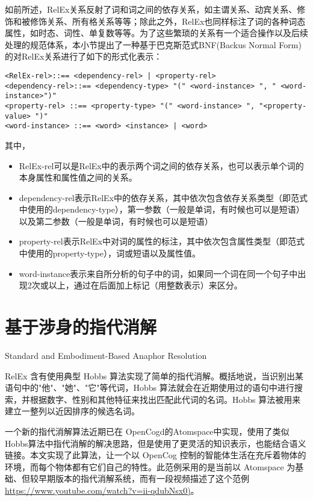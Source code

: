 如前所述，RelEx关系反射了词和词之间的依存关系，如主谓关系、动宾关系、修饰和被修饰关系、所有格关系等等；除此之外，RelEx也同样标注了词的各种词态属性，如时态、词性、单复数等等。为了这些繁琐的关系有一个适合操作以及后续处理的规范体系，本小节提出了一种基于巴克斯范式BNF(Backus Normal Form)的对RelEx关系进行了如下的形式化表示：

 {\tt\begin{scriptsize}\begin{lstlisting}
<RelEx-rel>::== <dependency-rel> | <property-rel>
<dependency-rel>::== <dependency-type> "(" <word-instance> ", " <word-instance>")"
<property-rel> ::== <property-type> "(" <word-instance> ", "<property-value> ")"
<word-instance> ::== <word> <instance> | <word>
  \end{lstlisting}\end{scriptsize}}

其中，

\begin{itemize}
\item RelEx-rel可以是RelEx中的表示两个词之间的依存关系，也可以表示单个词的本身属性和属性值之间的关系。
\item dependency-rel表示RelEx中的依存关系，其中依次包含依存关系类型（即范式中使用的dependency-type），第一参数（一般是单词，有时候也可以是短语）以及第二参数（一般是单词，有时候也可以是短语）
\item property-rel表示RelEx中对词的属性的标注，其中依次包含属性类型（即范式中使用的property-type），词或短语以及属性值。
\item word-instance表示来自所分析的句子中的词，如果同一个词在同一个句子中出现2次或以上，通过在后面加上标记（用整数表示）来区分。
\end{itemize}

\section{基于涉身的指代消解}{Standard and Embodiment-Based Anaphor Resolution}

RelEx 含有使用典型 Hobbs 算法实现了简单的指代消解\cite{Hobbs1978}。概括地说，当识别出某语句中的"他"、"她"、"它"等代词，Hobbs 算法就会在近期使用过的语句中进行搜索，并根据数字、性别和其他特征来找出匹配此代词的名词。Hobbs 算法被用来建立一整列以近因排序的候选名词。

一个新的指代消解算法近期已在 OpenCogd的Atomspace中实现，使用了类似Hobbs算法中指代消解的解决思路，但是使用了更灵活的知识表示，也能结合语义链接。本文实现了此算法，让一个以 OpenCog 控制的智能体生活在充斥着物体的环境，而每个物体都有它们自己的特性。此范例采用的是当前以 Atomspace 为基础、但较早期版本的指代消解系统，而有一段视频描述了这个范例\url{https://www.youtube.com/watch?v=ii-qdubNsx0)}。

